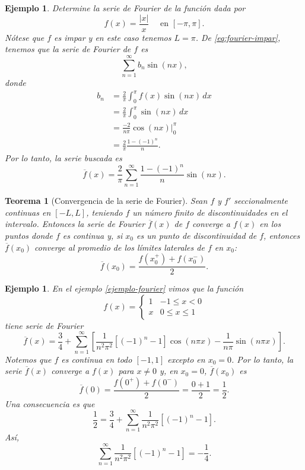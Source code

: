 \documentclass[11pt,letterpaper,draft]{report}
\newtheorem{theorem}[defn]{Teorema}
\newtheorem{example}[defn]{Ejemplo}
\newcommand\<{\langle}
\renewcommand\>{\rangle}
\begin{document}
\begin{example}
  Determine la serie de Fourier de la función dada por
  \[
    f(x) = \frac{|x|}{x} \quad \text{ en } [-\pi,\pi]
  .\]
  Nótese que $f$ es impar y en este caso tenemos $L=\pi$.
  De \eqref{eq:fourier-impar},
  tenemos que la serie de Fourier de $f$ es
  \[
    \sum_{n=1}^{\infty}b_n\sin(nx)
  ,\]
  donde
  \begin{align*}
    b_n
    &= \frac{2}{\pi}\int_{0}^{\pi}f(x)\sin(nx)\,dx \\
    &= \frac{2}{\pi}\int_{0}^{\pi}\sin(nx)\,dx \\
    &= \frac{-2}{n\pi}\cos(nx)\Big|_{0}^{\pi} \\
    &= \frac{2}{\pi}\frac{1-(-1)^{n}}{n}.
  \end{align*}
  Por lo tanto, la serie buscada es
  \[
    \overline{f}(x)
    =
    \frac{2}{\pi}\sum_{n=1}^{\infty}\frac{1-(-1)^{n}}{n}\sin(nx)
  .\]
  
\end{example}

\begin{theorem}[Convergencia de la serie de Fourier]
  Sean $f$ y $f'$ seccionalmente continuas en $[-L,L]$, teniendo $f$
  un número finito de discontinuidades en el intervalo. Entonces la
  serie de Fourier $\overline{f}(x)$ de $f$ converge a $f(x)$ en los
  puntos donde $f$ es continua y, si $x_0$ es un punto de
  discontinuidad de $f$, entonces $\overline{f}(x_0)$ converge al
  promedio de los límites laterales de $f$ en $x_0$:
  \[
    \overline{f}(x_0) = \frac{f(x_0^{+})+f(x_0^{-})}{2}
  .\]
\end{theorem}

\begin{example}
  En el ejemplo \ref{ejemplo-fourier} vimos que la función
  \[
    f(x) =
    \begin{cases}
      1 & -1\leq x<0 \\
      x & 0\leq x\leq 1
    \end{cases}
  \]
  tiene serie de Fourier
  \[
    \overline{f}(x)
    =
    \frac{3}{4}
    +
    \sum_{n=1}^{\infty}
    \left[
      \frac{1}{n^{2}\pi^{2}}[(-1)^{n}-1]\cos(n\pi x)
      -\frac{1}{n\pi}\sin(n\pi x)
    \right]
  .\]
  Notemos que $f$ es continua en todo $[-1,1]$ excepto en $x_0=0$.
  Por lo tanto, la serie $\overline{f}(x)$ converge a $f(x)$ para
  $x\neq 0$ y, en $x_0=0$, $\overline{f}(x_0)$ es
  \[
    \overline{f}(0)
    =\frac{f(0^{+})+f(0^{-})}{2}
    = \frac{0+1}{2}
    =\frac{1}{2}
  .\]
  Una consecuencia es que
  \[
    \frac{1}{2} = \frac{3}{4} + 
    \sum_{n=1}^{\infty}
      \frac{1}{n^{2}\pi^{2}}[(-1)^{n}-1]
  .\]
  Así,
  \[
    \sum_{n=1}^{\infty}
      \frac{1}{n^{2}\pi^{2}}[(-1)^{n}-1]
    =
    - \frac{1}{4}
  .\]
\end{example}
\end{document}
